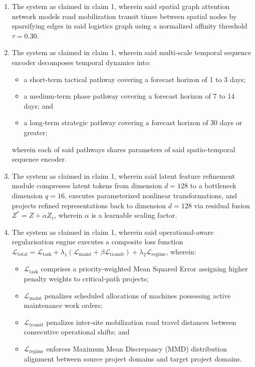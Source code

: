 \documentclass[11pt,a4paper]{article}
\begin{document}
\begin{enumerate}
    \item The system as claimed in claim 1, wherein said spatial graph attention network models road mobilization transit times between spatial nodes by sparsifying edges in said logistics graph using a normalized affinity threshold $\tau = 0.30$.

    \item The system as claimed in claim 1, wherein said multi-scale temporal sequence encoder decomposes temporal dynamics into:
    \begin{itemize}
        \item a short-term tactical pathway covering a forecast horizon of 1 to 3 days;
        \item a medium-term phase pathway covering a forecast horizon of 7 to 14 days; and
        \item a long-term strategic pathway covering a forecast horizon of 30 days or greater;
    \end{itemize}
    wherein each of said pathways shares parameters of said spatio-temporal sequence encoder.

    \item The system as claimed in claim 1, wherein said latent feature refinement module compresses latent tokens from dimension $d = 128$ to a bottleneck dimension $q = 16$, executes parameterized nonlinear transformations, and projects refined representations back to dimension $d = 128$ via residual fusion $Z^* = Z + \alpha Z_r$, wherein $\alpha$ is a learnable scaling factor.

    \item The system as claimed in claim 1, wherein said operational-aware regularisation engine executes a composite loss function $\mathcal{L}_{\text{total}} = \mathcal{L}_{\text{task}} + \lambda_1 (\mathcal{L}_{\text{maint}} + \beta \mathcal{L}_{\text{transit}}) + \lambda_2 \mathcal{L}_{\text{regime}}$, wherein:
    \begin{itemize}
        \item $\mathcal{L}_{\text{task}}$ comprises a priority-weighted Mean Squared Error assigning higher penalty weights to critical-path projects;
        \item $\mathcal{L}_{\text{maint}}$ penalizes scheduled allocations of machines possessing active maintenance work orders;
        \item $\mathcal{L}_{\text{transit}}$ penalizes inter-site mobilization road travel distances between consecutive operational shifts; and
        \item $\mathcal{L}_{\text{regime}}$ enforces Maximum Mean Discrepancy (MMD) distribution alignment between source project domains and target project domains.
    \end{itemize}


\end{enumerate}
\end{document}

